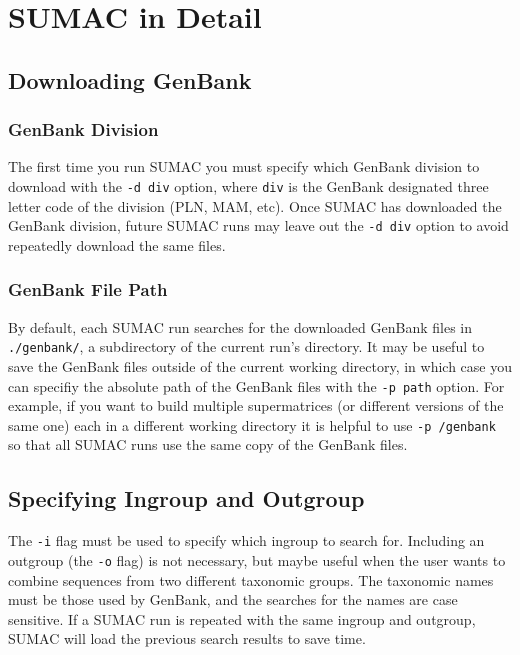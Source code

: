 \documentclass[10pt]{report}
\begin{document}

\chapter{SUMAC in Detail}

\section{Downloading GenBank}

\subsection{GenBank Division}

The first time you run SUMAC you must specify which GenBank division
to download with the \verb|-d div| option, where \verb|div| is the
GenBank designated three letter code of the division (PLN, MAM, etc).
Once SUMAC has downloaded the GenBank division, future SUMAC runs
may leave out the \verb|-d div| option to avoid repeatedly
download the same files.

\subsection{GenBank File Path}

By default, each SUMAC run searches for the downloaded GenBank files
in \verb|./genbank/|, a subdirectory of the current run's directory.
It may be useful to save the GenBank files outside of the current working
directory, in which case 
you can specifiy the absolute path of the GenBank files with the \verb|-p path| option.
For example, if you want to build
multiple supermatrices (or different versions of the same one) each in a different working directory
it is helpful
to use \verb|-p /genbank| so that all SUMAC runs use the same copy of the GenBank files.

\section{Specifying Ingroup and Outgroup}

The \verb|-i| flag must be used to specify which ingroup to search for. 
Including an outgroup (the \texttt{-o} flag) is not necessary, 
but maybe useful when the user wants to combine sequences from two
different taxonomic groups.
The taxonomic names must be those used by GenBank, and the 
searches for the names are case sensitive.
If a SUMAC run is repeated with the same ingroup and outgroup, SUMAC
will load the previous search results to save time.
\end{document}
